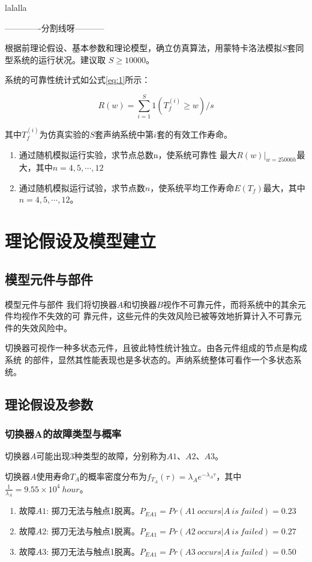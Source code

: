 \documentclass[10.5pt,twocolumn]{jbuaa}
\begin{document}
lalalla

-------------分割线呀-----------






根据前理论假设、基本参数和理论模型，确立仿真算法，用蒙特卡洛法模拟$S$套同型系统的运行状况。建议取 $S \geq 10000$。

系统的可靠性统计式如公式\eqref{eq:1}所示：

\begin{equation}
	R(w) = \sum_{i = 1}^{S}1(T_f^{(i)} \geq w) / s
	\label{eq:1}
\end{equation}

其中$T_f^{(i)}$为仿真实验的$S$套声纳系统中第$i$套的有效工作寿命。

\begin{enumerate}
	\item 通过随机模拟运行实验，求节点总数n，使系统可靠性 最大$R(w)|_{w = 25000h}$最大，其中$n = 4, 5, \cdots, 12$
	\item 通过随机模拟运行试验，求节点数$n$，使系统平均工作寿命$E(T_f)$最大，其中$n = 4, 5, \cdots, 12$。
\end{enumerate}
\section{理论假设及模型建立\cite{cite1}}
\subsection{模型元件与部件}
 模型元件与部件
我们将切换器$A$和切换器$B$视作不可靠元件，而将系统中的其余元件均视作不失效的可
靠元件，这些元件的失效风险已被等效地折算计入不可靠元件的失效风险中。 

切换器可视作一种多状态元件，且彼此特性统计独立。由各元件组成的节点是构成系统
的部件，显然其性能表现也是多状态的。声纳系统整体可看作一个多状态系统。
\subsection{理论假设及参数}
\subsubsection{切换器A的故障类型与概率}
切换器$A$可能出现3种类型的故障，分别称为$A1$、$A2$、$A3$。

切换器$A$使用寿命$T_A$的概率密度分布为$f_{T_A}(\tau) = \lambda_A e^{-\lambda_A \tau}$，其中$\frac{1}{\lambda_A} = 9.55 \times 10 ^ 4\ hour$。
\begin{enumerate}
	\item 故障$A1$: 掷刀无法与触点1脱离。$P_{EA1} = Pr(A1\   occurs | A
	  \ is\ failed) = 0.23$
	\item 故障$A2$: 掷刀无法与触点1脱离。$P_{EA1} = Pr(A2\ occurs | A\ is\ failed) = 0.27$
	 \item 故障$A3$: 掷刀无法与触点1脱离。$P_{EA1} = Pr(A3\ 
	  occurs | A\ 
	  is\ failed) = 0.50$
\end{enumerate}
\end{document}

